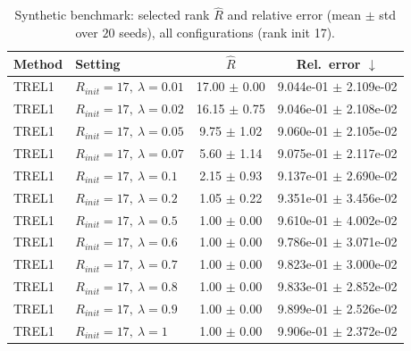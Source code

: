 \begin{table}[t]
\centering
\caption{Synthetic benchmark: selected rank \(\hat R\) and relative error (mean \(\pm\) std over \(20\) seeds), all configurations (rank init 17).}
\label{tab:results_synth_all}
\begin{tabular}{@{}llcc@{}}
\toprule
Method & Setting & \(\hat R\) & Rel.\ error \(\downarrow\) \\ \midrule
TREL1 & \(R_{init}=17,\ \lambda=0.01\) & 17.00 $\pm$ 0.00 & 9.044e-01 $\pm$ 2.109e-02 \\
TREL1 & \(R_{init}=17,\ \lambda=0.02\) & 16.15 $\pm$ 0.75 & 9.046e-01 $\pm$ 2.108e-02 \\
TREL1 & \(R_{init}=17,\ \lambda=0.05\) & 9.75 $\pm$ 1.02 & 9.060e-01 $\pm$ 2.105e-02 \\
TREL1 & \(R_{init}=17,\ \lambda=0.07\) & 5.60 $\pm$ 1.14 & 9.075e-01 $\pm$ 2.117e-02 \\
TREL1 & \(R_{init}=17,\ \lambda=0.1\) & 2.15 $\pm$ 0.93 & 9.137e-01 $\pm$ 2.690e-02 \\
TREL1 & \(R_{init}=17,\ \lambda=0.2\) & 1.05 $\pm$ 0.22 & 9.351e-01 $\pm$ 3.456e-02 \\
TREL1 & \(R_{init}=17,\ \lambda=0.5\) & 1.00 $\pm$ 0.00 & 9.610e-01 $\pm$ 4.002e-02 \\
TREL1 & \(R_{init}=17,\ \lambda=0.6\) & 1.00 $\pm$ 0.00 & 9.786e-01 $\pm$ 3.071e-02 \\
TREL1 & \(R_{init}=17,\ \lambda=0.7\) & 1.00 $\pm$ 0.00 & 9.823e-01 $\pm$ 3.000e-02 \\
TREL1 & \(R_{init}=17,\ \lambda=0.8\) & 1.00 $\pm$ 0.00 & 9.833e-01 $\pm$ 2.852e-02 \\
TREL1 & \(R_{init}=17,\ \lambda=0.9\) & 1.00 $\pm$ 0.00 & 9.899e-01 $\pm$ 2.526e-02 \\
TREL1 & \(R_{init}=17,\ \lambda=1\) & 1.00 $\pm$ 0.00 & 9.906e-01 $\pm$ 2.372e-02 \\
\bottomrule
\end{tabular}
\end{table}